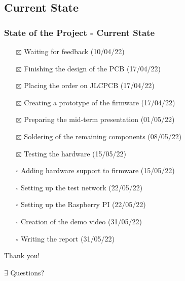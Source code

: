 \documentclass[aspectratio=169]{beamer}
\begin{document}
\subsection{Current State}
\begin{frame}
\frametitle{State of the Project - Current State}

\begin{itemize}
 \item[$\boxtimes$] Waiting for feedback                      (10/04/22) 
 \item[$\boxtimes$] Finishing the design of the PCB           (17/04/22) 
 \item[$\boxtimes$] Placing the order on JLCPCB               (17/04/22) 
 \item[$\boxtimes$] Creating a prototype of the firmware      (17/04/22) 
 \item[$\boxtimes$] Preparing the mid-term presentation       (01/05/22) 
 \item[$\boxtimes$] Soldering of the remaining components     (08/05/22) 
 \item[$\boxtimes$] Testing the hardware                      (15/05/22) 
 \item[$\square$] Adding hardware support to firmware       (15/05/22) 
 \item[$\square$] Setting up the test network               (22/05/22) 
 \item[$\square$] Setting up the Raspberry PI               (22/05/22) 
 \item[$\square$] Creation of the demo video                (31/05/22) 
 \item[$\square$] Writing the report                        (31/05/22) 
\end{itemize}
\end{frame}

\begin{frame}
\Huge{\centerline{Thank you!}}
\Huge{\centerline{$\exists$ Questions?}}
\end{frame}
\end{document}
